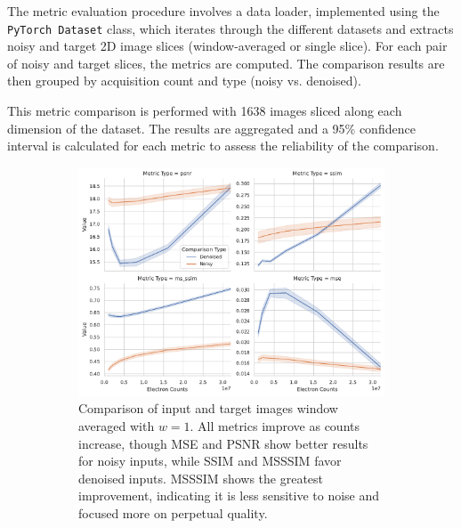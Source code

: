 The metric evaluation procedure involves a data loader, implemented using the \texttt{PyTorch Dataset} class, which iterates through the different datasets and extracts noisy and target 2D image slices (window-averaged or single slice). For each pair of noisy and target slices, the metrics are computed. The comparison results are then grouped by acquisition count and type (noisy vs. denoised).

This metric comparison is performed with \num{1638} images sliced along each dimension of the dataset. The results are aggregated and a 95\% confidence interval is calculated for each metric to assess the reliability of the comparison. 
\begin{figure}
    \centering
    \begin{subfigure}[t]{0.48\textwidth}
        \centering
        \includegraphics[width=\textwidth]{images/metrics_comparison_denoised_noisy.pdf}
        \caption{Comparison of input and target images window averaged with $w=1$. All metrics improve as counts increase, though \gls{MSE} and \gls{PSNR} show better results for noisy inputs, while \gls{SSIM} and \gls{MSSSIM} favor denoised inputs. \gls{MSSSIM} shows the greatest improvement, indicating it is less sensitive to noise and focused more on perpetual quality.}
        \label{fig:metrics-comparison}
    \end{subfigure}
    \hfill
    \begin{subfigure}[t]{0.48\textwidth}
        \centering

\end{subfigure}
\end{figure}
